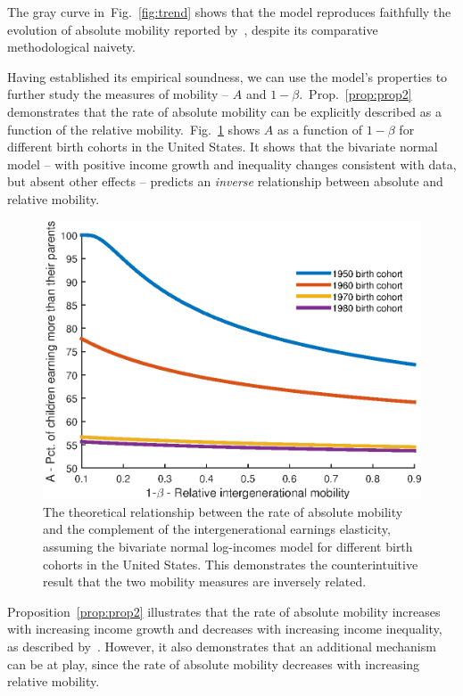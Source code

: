 \documentclass[12pt,times,letter]{article}
\newcommand{\Pref}[1]{Proposition~\ref{prop:#1}}
\newcommand{\pref}[1]{Prop.~\ref{prop:#1}}
\newcommand{\flabel}[1]{\label{fig:#1}}
\newcommand{\fref}[1]{Fig.~\ref{fig:#1}}
\numberwithin{equation}{section}
\begin{document}
The gray curve in~\fref{trend} shows that the model reproduces faithfully the evolution of absolute mobility reported by~\citet{chetty2017fading}, despite its comparative methodological naivety.

Having established its empirical soundness, we can use the model's properties to further study the measures of mobility -- $A$ and $1-\beta$.~\pref{prop2} demonstrates that the rate of absolute mobility can be explicitly described as a function of the relative mobility.~\fref{relat} shows $A$ as a function of $1-\beta$ for different birth cohorts in the United States. It shows that the bivariate normal model -- with positive income growth and inequality changes consistent with data, but absent other effects -- predicts an \textit{inverse} relationship between absolute and relative mobility.

\begin{figure}[!htb]
\centering
\includegraphics[width=1.0\textwidth] {./figs/relat1.eps}
\caption{The theoretical relationship between the rate of absolute mobility and the complement of the intergenerational earnings elasticity, assuming the bivariate normal log-incomes model for different birth cohorts in the United States. This demonstrates the counterintuitive result that the two mobility measures are inversely related.}
\flabel{relat}
\end{figure}

\Pref{prop2} illustrates that the rate of absolute mobility increases with increasing income growth and decreases with increasing income inequality, as described by~\citet{chetty2017fading}. However, it also demonstrates that an additional mechanism can be at play, since the rate of absolute mobility decreases with increasing relative mobility.
\end{document}
